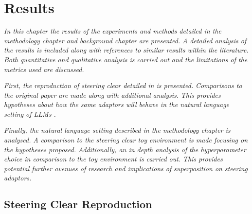 \chapter{Results}
\label{ch:results}

\emph{In this chapter the results of the experiments and methods detailed in the methodology chapter  and background chapter  are presented.}
\emph{A detailed analysis of the results is included along with references to similar results within the literature.}
\emph{Both quantitative and qualitative analysis is carried out and the limitations of the metrics used are discussed.}

\emph{First, the reproduction of steering clear \citep{steering-clear} detailed in  is presented.}
\emph{Comparisons to the original paper are made along with additional analysis.}
\emph{This provides hypotheses about how the same adaptors will behave in the natural language setting of LLMs .}

\emph{Finally, the natural language setting described in the methodology chapter  is analysed.}
\emph{A comparison to the steering clear toy environment is made focusing on the hypotheses proposed.}
\emph{Additionally, an in depth analysis of the hyperparameter choice in comparison to the toy environment is carried out.}
\emph{This provides potential further avenues of research and implications of superposition  on steering adaptors.}

\section{Steering Clear Reproduction}

